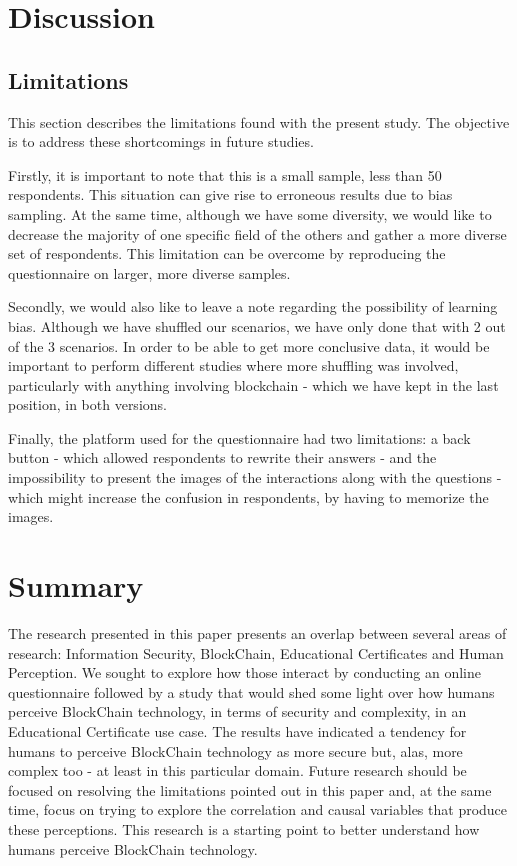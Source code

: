 \section{Discussion}

\subsection{Limitations}

This section describes the limitations found with the present study. The objective is to address these shortcomings in future studies. 
  
Firstly, it is important to note that this is a small sample, less than 50 respondents. This situation can give rise to erroneous results due to bias sampling. At the same time, although we have some diversity, we would like to decrease the majority of one specific field of the others and gather a more diverse set of respondents. This limitation can be overcome by reproducing the questionnaire on larger, more diverse samples. 
  
Secondly, we would also like to leave a note regarding the possibility of learning bias. Although we have shuffled our scenarios, we have only done that with 2 out of the 3 scenarios. In order to be able to get more conclusive data, it would be important to perform different studies where more shuffling was involved, particularly with anything involving blockchain - which we have kept in the last position, in both versions. 
  
Finally, the platform used for the questionnaire had two limitations: a back button - which allowed respondents to rewrite their answers - and the impossibility to present the images of the interactions along with the questions - which might increase the confusion in respondents, by having to memorize the images.
  
\section{Summary}

The research presented in this paper presents an overlap between several areas of research: Information Security, BlockChain, Educational Certificates and Human Perception. We sought to explore how those interact by conducting an online questionnaire followed by a study that would shed some light over how humans perceive BlockChain technology, in terms of security and complexity, in an Educational Certificate use case. The results have indicated a tendency for humans to perceive BlockChain technology as more secure but, alas, more complex too - at least in this particular domain. Future research should be focused on resolving the limitations pointed out in this paper and, at the same time, focus on trying to explore the correlation and causal variables that produce these perceptions. This research is a starting point to better understand how humans perceive BlockChain technology.